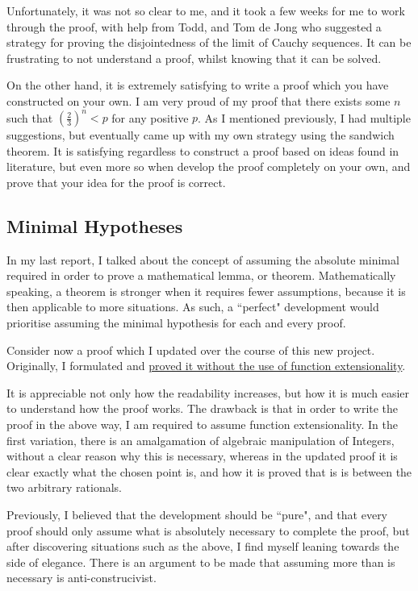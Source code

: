 \documentclass[ProjectReport]{subfiles}
\begin{document}
Unfortunately, it was not so clear to me, and it took a few weeks for me to work through the proof, with help from Todd, and Tom de Jong who suggested a strategy for proving the disjointedness of the limit of Cauchy sequences. It can be frustrating to not understand a proof, whilst knowing that it can be solved. 

On the other hand, it is extremely satisfying to write a proof which you have constructed on your own. I am very proud of my proof that there exists some $n$ such that $(\frac{2}{3})^n < p$ for any positive $p$. As I mentioned previously, I had multiple suggestions, but eventually came up with my own strategy using the sandwich theorem. It is satisfying regardless to construct a proof based on ideas found in literature, but even more so when develop the proof completely on your own, and prove that your idea for the proof is correct. 

\subsection{Minimal Hypotheses}

In my last report, I talked about the concept of assuming the absolute minimal required in order to prove a mathematical lemma, or theorem. Mathematically speaking, a theorem is stronger when it requires fewer assumptions, because it is then applicable to more situations. As such, a ``perfect" development would prioritise assuming the minimal hypothesis for each and every proof. 

Consider now a proof which I updated over the course of this new project. Originally, I formulated and \href{https://adsneap.github.io/CSProject/Rationals.html#27337}{proved it without the use of function extensionality}. 


It is appreciable not only how the readability increases, but how it is much easier to understand how the proof works. The drawback is that in order to write the proof in the above way, I am required to assume function extensionality. In the first variation, there is an amalgamation of algebraic manipulation of Integers, without a clear reason why this is necessary, whereas in the updated proof it is clear exactly what the chosen point is, and how it is proved that is is between the two arbitrary rationals. 

Previously, I believed that the development should be ``pure", and that every proof should only assume what is absolutely necessary to complete the proof, but after discovering situations such as the above, I find myself leaning towards the side of elegance. There is an argument to be made that assuming more than is necessary is anti-construcivist. 
\end{document}
